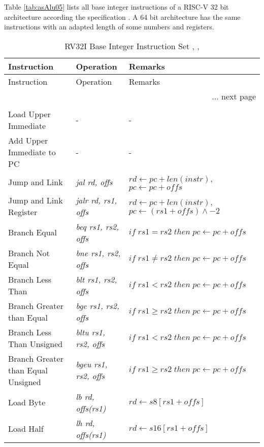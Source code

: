 
Table \ref{tab:asAlu05} lists all base integer instructions of a RISC-V 32 bit architecture according the specification \cite{riscvisa03}. A 64 bit architecture has the same instructions with an adapted length of some numbers and registers.
\begin{longtable}{|m{3.5cm}<{\raggedright} |m{3cm}<{\raggedright} |m{5.5cm}<{\raggedright} |} %
\caption{RV32I Base Integer Instruction Set \cite{riscvisa01}, \cite{riscvisa02}, \cite{riscvisa03}}\\
\hline
Instruction & Operation & Remarks    \\
\hline
\endfirsthead
Instruction  & Operation  & Remarks    \\
\hline
\endhead
\multicolumn{3}{r}{... next page}\\
\endfoot
\hline
\multicolumn{3}{r}{End of table.} \\
\endlastfoot
Load Upper Immediate & - & - \\
\hline
Add Upper Immediate to PC & - & - \\
\hline
Jump and Link & \textit{jal rd, offs} & $rd \leftarrow pc + len(instr)$, $pc \leftarrow pc + offs$  \\
\hline
Jump and Link Register & \textit{jalr rd, rs1, offs} & $rd \leftarrow pc + len(instr)$, \- $pc \leftarrow (rs1 + offs)\wedge{-2}$ \\
\hline
Branch Equal & \textit{beq rs1, rs2, offs} & $if \; rs1 = rs2 \; then \; pc \leftarrow pc + offs$ \\
\hline
Branch Not Equal & \textit{bne rs1, rs2, offs} & $if \; rs1 \neq rs2 \; then \; pc \leftarrow pc + offs$ \\
\hline
Branch Less Than & \textit{blt rs1, rs2, offs} & $if \; rs1 < rs2 \; then \; pc \leftarrow pc + offs$ \\
\hline
Branch Greater than Equal & \textit{bge rs1, rs2, offs} & $if \; rs1 \geq rs2 \; then \; pc \leftarrow pc + offs$ \\
\hline
Branch Less Than Unsigned & \textit{bltu rs1, rs2, offs} & $if \; rs1 < rs2 \; then \; pc \leftarrow pc + offs$ \\
\hline
Branch Greater than Equal Unsigned & \textit{bgeu rs1, rs2, offs} & $if \; rs1 \geq rs2 \; then \; pc \leftarrow pc + offs$ \\
\hline
Load Byte & \textit{lb rd, offs(rs1)} & $rd \leftarrow s8[rs1 + offs]$ \\
\hline
Load Half & \textit{lh rd, offs(rs1)} & $rd \leftarrow s16[rs1 + offs]$ \\

\end{longtable}
